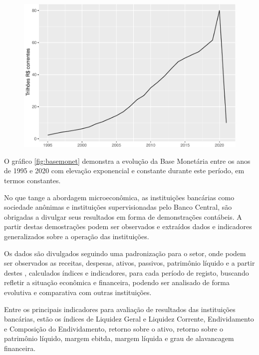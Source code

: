 \documentclass[12pt,openright,oneside,a4paper,chapter=TITLE,section=TITLE,subsection=TITLE,english,french,spanish,portugues,sumario=tradicional]{abntex2}
\begin{document}
\begin{figure}

\begin{center}\includegraphics{12-exportedfigures/money-1} \end{center}
\label{fig:basemonet}
\end{figure}

O gráfico \autoref{fig:basemonet} demonstra a evolução da Base Monetária entre os anos de 1995 e 2020 com elevação exponencial e constante durante este período, em termos constantes.

No que tange a abordagem microeconômica, as instituições bancárias como sociedade anônimas e instituições supervisionadas pelo Banco Central, são obrigadas a divulgar seus resultados em forma de demonstrações contábeis. A partir destas demostrações podem ser observados e extraídos dados e indicadores generalizados sobre a operação das instituições.

Os dados são divulgados seguindo uma padronização para o setor, onde podem ser observados as receitas, despesas, ativos, passivos, patrimônio líquido e a partir destes , calculados índices e indicadores, para cada período de registo, buscando refletir a situação econômica e financeira, podendo ser analisado de forma evolutiva e comparativa com outras instituições.

Entre os principais indicadores para avaliação de resultados das instituições bancárias, estão os índices de Liquidez Geral e Liquidez Corrente, Endividamento e Composição do Endividamento, retorno sobre o ativo, retorno sobre o patrimônio líquido, margem ebitda, margem líquida e grau de alavancagem financeira.
\end{document}
